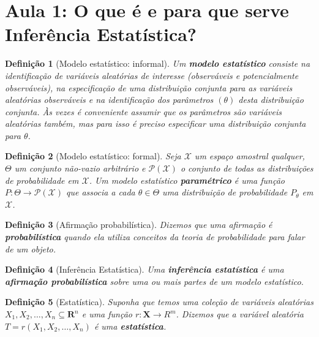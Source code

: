 \documentclass{article}
\newtheorem{definition}{Definição}
\begin{document}
\textbf{}
\vspace{4mm}

\textbf{}
\vspace{4mm}

\textbf{}
\vspace{4mm}

\textbf{}

\newpage

\section*{Aula 1: O que é e para que serve Inferência Estatística?}
\label{s1}

\begin{definition}[Modelo estatístico: informal]
Um \textbf{modelo estatístico} consiste na identificação de variáveis aleatórias de interesse (observáveis e potencialmente observáveis), na especificação de uma distribuição conjunta para as variáveis aleatórias observáveis e na identificação dos parâmetros $(\theta)$ desta distribuição conjunta. Às vezes é conveniente assumir que os parâmetros são variáveis aleatórias também, mas para isso é preciso especificar uma distribuição conjunta para $\theta$.
\end{definition}

\begin{definition}[Modelo estatístico: formal]
Seja $\mathcal{X}$ um espaço amostral qualquer, $\Theta$ um conjunto não-vazio arbitrário e $\mathcal{P(X)}$ o conjunto de todas as distribuições de probabilidade em $\mathcal{X}$. Um modelo estatístico \textbf{paramétrico} é uma função $P: \Theta \rightarrow \mathcal{P(X)}$ que associa a cada $\theta \in \Theta$ uma distribuição de probabilidade $P_\theta$ em $\mathcal{X}$.
\end{definition}

\begin{definition}[Afirmação probabilística]
Dizemos que uma afirmação é \textbf{probabilística} quando ela utiliza conceitos da teoria de probabilidade para falar de um objeto.
\end{definition}

\begin{definition}[Inferência Estatística]
Uma \textbf{inferência estatística} é uma \textbf{afirmação probabilística} sobre uma ou mais partes de um modelo estatístico.
\end{definition}

\begin{definition}[Estatística]
Suponha que temos uma coleção de variáveis aleatórias $X_1, X_2, \ldots, X_n \subseteq \mathbf{R}^n$ e uma função $r: \mathbf{X} \rightarrow R^m$. Dizemos que a variável aleatória $T = r(X_1, X_2, \ldots, X_n)$ é uma \textbf{estatística}.
\end{definition}
\end{document}
